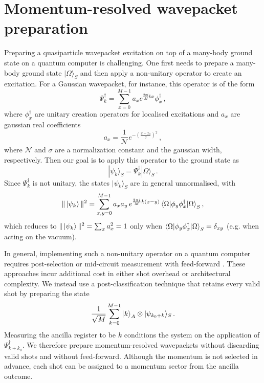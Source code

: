 \documentclass[aps,floatfix,10pt,amssymb,amsfont,amsmath,superscriptaddress,float,nofootinbib,longbibliography,nobalancelastpage,twocolumn]{revtex4-2}
\begin{document}
\section{Momentum-resolved wavepacket preparation}
\label{section:localized_wavepacket}
Preparing a quasiparticle wavepacket excitation on top of a many-body ground state on a quantum computer is challenging. One first needs to prepare a many-body ground state $|\Omega\rangle_S$ and then apply a non-unitary operator to create an excitation. For a Gaussian wavepacket, for instance, this operator is of the form
\begin{equation}
    \Psi_k^{\dagger} = \sum_{x=0}^{M-1} a_xe^{\frac{2\pi i}{M}kx} \phi^{\dagger}_x\,,
\end{equation}
where $\phi^{\dagger}_x$ are unitary creation operators for localised excitations and $a_x$ are gaussian real coefficients 
$$a_x=\frac{1}{\mathcal{N}}e^{-\left(\frac{x-x_0}{\sigma}\right)^2}\,,$$
where $\mathcal{N}$ and $\sigma$ are a normalization constant and the gaussian width, respectively. Then our goal is to apply this operator to the ground state as 
$$|\psi_k\rangle_S = \Psi_k^{\dagger}|\Omega\rangle_S\,.$$
Since $\Psi_k^\dagger$ is not unitary, the states $|\psi_k\rangle_S$ are in general unnormalised, with
\begin{equation}
\| \ket{\psi_k} \|^2 = \sum_{x,y=0}^{M-1} a_x a_y\, e^{\frac{2\pi i}{M}k(x-y)} \braket{\Omega | \phi_y \phi_x^\dagger | \Omega}_S ,
\end{equation}
which reduces to $\| \ket{\psi_k} \|^2 =\sum_x a_x^2 = 1$ only when $\braket{\Omega | \phi_y \phi_x^\dagger | \Omega}_S = \delta_{xy}$ (e.g. when acting on the vacuum). 

In general, implementing such a non-unitary operator on a quantum computer requires post-selection or mid-circuit measurement with feed-forward \cite{childs2012hamiltonian, turco2025creation, Gily_n_2019, mcardle2026quantum, o2025quantum, corcoles2021exploiting, pino2021demonstration, turco2025creation}. These approaches incur additional cost in either shot overhead or architectural complexity. We instead use a post-classification technique that retains every valid shot by preparing the state
\begin{equation}
    \frac{1}{\sqrt{M}}\sum_{k=0}^{M-1} \ket{k}_A\otimes|\psi_{k_0+k}\rangle_S\,.
\end{equation}
Measuring the ancilla register to be $k$ conditions the system on the application of $\Psi^{\dagger}_{k+k_0}$. We therefore prepare momentum-resolved wavepackets without discarding valid shots and without feed-forward. Although the momentum is not selected in advance, each shot can be assigned to a momentum sector from the ancilla outcome.
\end{document}
